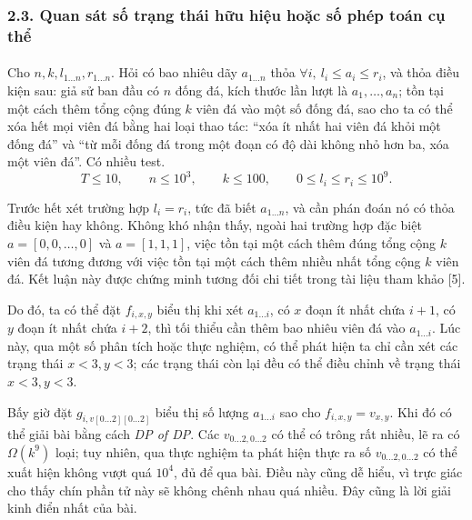 \documentclass[11pt]{article}
\begin{document}
\subsubsection*{2.3. Quan sát số trạng thái hữu hiệu hoặc số phép toán cụ thể}

\paragraph{}
Cho \(n,k,l_{1\ldots n},r_{1\ldots n}\). Hỏi có bao nhiêu dãy \(a_{1\ldots n}\)
thỏa \(\forall i,\ l_i\le a_i\le r_i\), và thỏa điều kiện sau: giả sử ban đầu
có \(n\) đống đá, kích thước lần lượt là \(a_1,\ldots,a_n\); tồn tại một cách
thêm tổng cộng đúng \(k\) viên đá vào một số đống đá, sao cho ta có thể xóa
hết mọi viên đá bằng hai loại thao tác: ``xóa ít nhất hai viên đá khỏi một
đống đá'' và ``từ mỗi đống đá trong một đoạn có độ dài không nhỏ hơn ba, xóa
một viên đá''. Có nhiều test.
\[
  T\le 10,\qquad n\le 10^3,\qquad k\le 100,\qquad
  0\le l_i\le r_i\le 10^9.
\]

Trước hết xét trường hợp \(l_i=r_i\), tức đã biết \(a_{1\ldots n}\), và cần
phán đoán nó có thỏa điều kiện hay không. Không khó nhận thấy, ngoài hai
trường hợp đặc biệt \(a=[0,0,\ldots,0]\) và \(a=[1,1,1]\), việc tồn tại một
cách thêm đúng tổng cộng \(k\) viên đá tương đương với việc tồn tại một cách
thêm nhiều nhất tổng cộng \(k\) viên đá. Kết luận này được chứng minh tương
đối chi tiết trong tài liệu tham khảo [5].

Do đó, ta có thể đặt \(f_{i,x,y}\) biểu thị khi xét \(a_{1\ldots i}\), có \(x\)
đoạn ít nhất chứa \(i+1\), có \(y\) đoạn ít nhất chứa \(i+2\), thì tối thiểu
cần thêm bao nhiêu viên đá vào \(a_{1\ldots i}\). Lúc này, qua một số phân
tích hoặc thực nghiệm, có thể phát hiện ta chỉ cần xét các trạng thái
\(x<3,y<3\); các trạng thái còn lại đều có thể điều chỉnh về trạng thái
\(x<3,y<3\).

Bấy giờ đặt \(g_{i,v[0\ldots 2][0\ldots 2]}\) biểu thị số lượng
\(a_{1\ldots i}\) sao cho \(f_{i,x,y}=v_{x,y}\). Khi đó có thể giải bài bằng
cách \emph{DP of DP}. Các \(v_{0\ldots 2,0\ldots 2}\) có thể có trông rất
nhiều, lẽ ra có \(\Omega(k^9)\) loại; tuy nhiên, qua thực nghiệm ta phát hiện
thực ra số \(v_{0\ldots 2,0\ldots 2}\) có thể xuất hiện không vượt quá
\(10^4\), đủ để qua bài. Điều này cũng dễ hiểu, vì trực giác cho thấy chín
phần tử này sẽ không chênh nhau quá nhiều. Đây cũng là lời giải kinh điển nhất
của bài.
\end{document}
